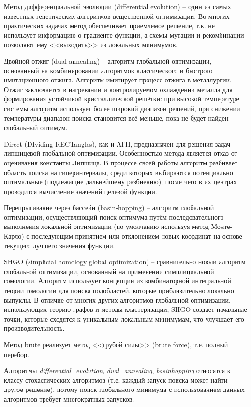 \documentclass[a4paper,12pt,russian]{article}
\begin{document}
Метод дифференциальной эволюции (differential evolution) -- один из самых известных генетических алгоритмов вещественной оптимизации. Во многих практических задачах метод обеспечивает приемлемое решение, т.к. не использует информацию о градиенте функции, а схемы мутации и рекомбинации позволяют ему <<выходить>> из локальных минимумов.

Двойной отжиг (dual annealing) -- алгоритм глобальной оптимизации, основанный на комбинировании алгоритмов классического и быстрого имитационного отжига. Алгоритм имитирует процесс отжига в металлургии. Отжиг заключается в нагревании и контролируемом охлаждении металла для формирования устойчивой кристаллической решётки: при высокой температуре системы алгоритм использует более широкий диапазон решений, при снижении температуры диапазон поиска становится всё меньше, пока не будет найден глобальный оптимум.

Direct (DIviding RECTangles), как и АГП, предназначен для решения задач липшицевой глобальной оптимизации. Особенностью метода является отказ от оценивания константы Липшица. В процессе своей работы алгоритм разбивает область поиска на гиперинтервалы, среди которых выбираются потенциально оптимальные (подлежащие дальнейшему разбиению), после чего в их центрах проводится вычисление значений целевой функции.

Перепрыгивание через бассейн (basin-hopping) -- алгоритм глобальной оптимизации, осуществляющий поиск оптимума путём последовательного выполнения локальной оптимизации (по умолчанию используя метод Монте-Карло) с последующим принятием или отклонением новых координат на основе текущего лучшего значения функции.

SHGO (simplicial homology global optimization) -- сравнительно новый алгоритм глобальной оптимизации, основанный на применении симплициальной гомологии. Алгоритм использует концепции из комбинаторной интегральной теории гомологии для поиска подобластей, которые приблизительно локально выпуклы. В отличие от многих других алгоритмов глобальной оптимизации, использующих теорию графов и методы кластеризации, SHGO создает начальные точки, которые сходятся к уникальным локальным минимумам, что улучшает его производительность.

Метод brute реализует метод <<грубой силы>> (brute force), т.е. полный перебор.

Алгоритмы \textit{differential\_evolution}, \textit{dual\_annealing}, \textit{basinhopping} относятся к классу стохастических алгоритмов (т.е. каждый запуск поиска может найти другое решение), потому поиск глобального минимума с использованием данных алгоритмов требует многократных запусков.
\end{document}
